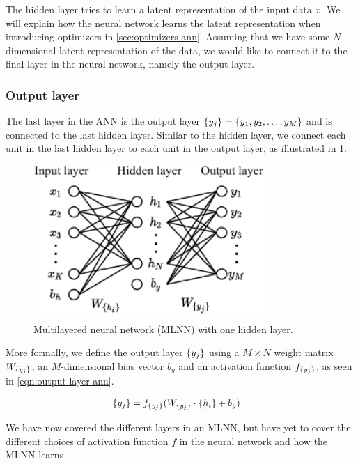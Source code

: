 The hidden layer tries to learn a latent representation of the input data $x$. We will explain how the neural network learns the latent representation when introducing optimizers in \cref{sec:optimizers-ann}. Assuming that we have some $N$-dimensional latent representation of the data, we would like to connect it to the final layer in the neural network, namely the output layer.

\subsubsection{Output layer}
The last layer in the ANN is the output layer $\left\{ {y}_{j} \right\} = \left\{ y_1, y_2, \ldots, y_M \right\}$ and is connected to the last hidden layer. Similar to the hidden layer, we connect each unit in the last hidden layer to each unit in the output layer, as illustrated in \cref{fig:mlnn-one-hidden}.

\begin{figure}[H]
    \centering
    \includegraphics[width=9cm]{thesis/figures/artificial-neural-network_cropped.pdf}
    \caption{Multilayered neural network (MLNN) with one hidden layer.}
    \label{fig:mlnn-one-hidden}
\end{figure}

More formally, we define the output layer $\left\{ {y}_{j} \right\}$ using a $M \times N$ weight matrix $W_{\left\{ {y}_{j} \right\}}$, an $M$-dimensional bias vector $b_y$ and an activation function $f_{\left\{ {y}_{j} \right\}}$, as seen in \cref{eqn:output-layer-ann}.

\begin{align}
    \label{eqn:output-layer-ann}
    \left\{ {y}_{j} \right\} &= f_{\left\{ {y}_{j} \right\}}(W_{\left\{ {y}_{j} \right\}} \cdot \left\{ {h}_{i} \right\} + b_y)
\end{align}

We have now covered the different layers in an MLNN, but have yet to cover the different choices of activation function $f$ in the neural network and how the MLNN learns.

